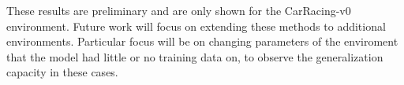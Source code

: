 \documentclass{article}
\begin{document}
These results are preliminary and are only shown for the CarRacing-v0
environment. Future work will focus on extending these methods to
additional environments. Particular focus will be on changing
parameters of the enviroment that the model had little or no training
data on, to observe the generalization capacity in these cases.








\end{document}
